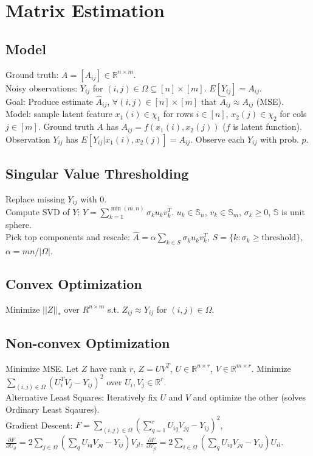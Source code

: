 \section{Matrix Estimation}

\subsection*{Model}
Ground truth: $A = [A_{ij}] \in \mathbb{R}^{n \times m}$.\\
Noisy observations: $Y_{ij}$ for $(i, j) \in \Omega \subseteq [n] \times [m]$. $E[Y_{ij}] = A_{ij}$.\\
Goal: Produce estimate $\hat{A}_{ij}$, $\forall (i, j) \in [n] \times [m]$ that $\hat{A}_{ij}\approx A_{ij}$ (MSE).\\
Model: sample latent feature $x_1(i) \in \chi_1$ for rows $i \in [n]$, $x_2(j) \in \chi_2$ for cols $j \in [m]$. Ground truth $A$ has $A_{ij} = f(x_1(i), x_2(j))$ ($f$ is latent function). Observation $Y_{ij}$ has $E[Y_{ij} | x_1(i), x_2(j)] = A_{ij}.$ Observe each $Y_{ij}$ with prob. $p$.

\subsection*{Singular Value Thresholding}

Replace missing $Y_{ij}$ with $0$.\\
Compute SVD of $Y$: $Y = \sum_{k=1}^{\min(m, n)}\sigma_k u_k v_k^T$. $u_k \in \mathbb{S}_n$, $v_k \in \mathbb{S}_m$, $\sigma_k \geq 0$, $\mathbb{S}$ is unit sphere.\\
Pick top components and rescale: $\hat{A} = \alpha \sum_{k \in S} \sigma_k u_k v_k^T$, $S = \{k: \sigma_k \geq \text{threshold}\}$, $\alpha=mn/|\Omega|$.

\subsection*{Convex Optimization}

Minimize $||Z||_*$ over $R^{n\times m}$ s.t. $Z_{ij} \approx Y_{ij}$ for $(i, j) \in \Omega$.\\

\subsection*{Non-convex Optimization}

Minimize MSE. Let $Z$ have rank $r$, $Z = UV^T$, $U \in \mathbb{R}^{n \times r}$, $V \in \mathbb{R}^{m \times r}$. Minimize $\sum_{(i, j)\in\Omega}(U_i^T V_j - Y_{ij})^2$ over $U_i, V_j \in \mathbb{R}^r$.\\
Alternative Least Squares: Iteratively fix $U$ and $V$ and optimize the other (solves Ordinary Least Sqaures).\\
Gradient Descent: $F = \sum_{(i, j)\in \Omega}(\sum_{q=1}^r U_{iq} V_{jq} - Y_{ij})^2$, $\frac{\partial F}{\partial U_{il}} = 2 \sum_{j \in \Omega} (\sum_q U_{iq}V_{jq} - Y_{ij})V_{jl}$, $\frac{\partial F}{\partial V_{jl}} = 2 \sum_{i \in \Omega} (\sum_q U_{iq}V_{jq} - Y_{ij})U_{il}$.

